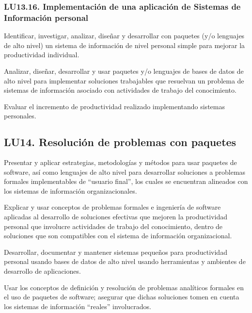 \subsubsection{LU13.16. Implementación de una aplicación de Sistemas de Información personal}\label{sec:LU13.16}
\begin{LearningUnit}
\begin{LUGoal}
\item Identificar, investigar, analizar, diseñar y desarrollar con paquetes (y/o lenguajes de alto nivel) un sistema de información de nivel personal simple para mejorar la productividad individual.
\end{LUGoal}

\begin{LUObjective}
\item Analizar, diseñar, desarrollar y usar paquetes y/o lenguajes de bases de datos de alto nivel para implementar soluciones trabajables que resuelvan un problema de sistemas de información asociado con actividades de trabajo del conocimiento.
\item Evaluar el incremento de productividad realizado implementando sistemas personales.
\end{LUObjective}
\end{LearningUnit}

\subsection{LU14. Resolución de problemas con paquetes}\label{sec:LU14}
\begin{LearningUnit}
\begin{LUGoal}
\item Presentar y aplicar estrategias, metodologías y métodos para usar paquetes de software, así como lenguajes de alto nivel para desarrollar soluciones a problemas formales implementables de ``usuario final'', los cuales se encuentran alineados con los sistemas de información organizacionales.
\end{LUGoal}

\begin{LUObjective}
\item Explicar y usar conceptos de problemas formales e ingeniería de software aplicadas al desarrollo de soluciones efectivas que mejoren la productividad personal que involucre actividades de trabajo del conocimiento, dentro de soluciones que son compatibles con el sistema de información organizacional.
\item Desarrollar, documentar y mantener sistemas pequeños para productividad personal usando bases de datos de alto nivel usando herramientas y ambientes de desarrollo de aplicaciones.
\item Usar los conceptos de definición y resolución de problemas analíticos formales en el uso de paquetes de software; asegurar que dichas soluciones tomen en cuenta los sistemas de información ``reales'' involucrados.
\end{LUObjective}
\end{LearningUnit}

